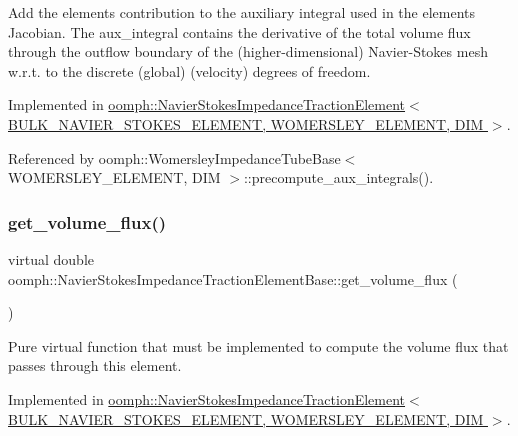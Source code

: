Add the element\textquotesingle{}s contribution to the auxiliary integral used in the element\textquotesingle{}s Jacobian. The aux\+\_\+integral contains the derivative of the total volume flux through the outflow boundary of the (higher-\/dimensional) Navier-\/\+Stokes mesh w.\+r.\+t. to the discrete (global) (velocity) degrees of freedom. 



Implemented in \hyperlink{classoomph_1_1NavierStokesImpedanceTractionElement_addae9a132e1004423ce501f71a84fe07}{oomph\+::\+Navier\+Stokes\+Impedance\+Traction\+Element$<$ B\+U\+L\+K\+\_\+\+N\+A\+V\+I\+E\+R\+\_\+\+S\+T\+O\+K\+E\+S\+\_\+\+E\+L\+E\+M\+E\+N\+T, W\+O\+M\+E\+R\+S\+L\+E\+Y\+\_\+\+E\+L\+E\+M\+E\+N\+T, D\+I\+M $>$}.



Referenced by oomph\+::\+Womersley\+Impedance\+Tube\+Base$<$ W\+O\+M\+E\+R\+S\+L\+E\+Y\+\_\+\+E\+L\+E\+M\+E\+N\+T, D\+I\+M $>$\+::precompute\+\_\+aux\+\_\+integrals().

\mbox{\label{classoomph_1_1NavierStokesImpedanceTractionElementBase_a7f71882ae8a0d34e3d5a5c91586081b3}} 
\subsubsection{\texorpdfstring{get\+\_\+volume\+\_\+flux()}{get\_volume\_flux()}}
{\footnotesize\ttfamily virtual double oomph\+::\+Navier\+Stokes\+Impedance\+Traction\+Element\+Base\+::get\+\_\+volume\+\_\+flux (\begin{DoxyParamCaption}{ }\end{DoxyParamCaption})\hspace{0.3cm}{\ttfamily [pure virtual]}}



Pure virtual function that must be implemented to compute the volume flux that passes through this element. 



Implemented in \hyperlink{classoomph_1_1NavierStokesImpedanceTractionElement_a853055ebb50a6500602288a6f0563852}{oomph\+::\+Navier\+Stokes\+Impedance\+Traction\+Element$<$ B\+U\+L\+K\+\_\+\+N\+A\+V\+I\+E\+R\+\_\+\+S\+T\+O\+K\+E\+S\+\_\+\+E\+L\+E\+M\+E\+N\+T, W\+O\+M\+E\+R\+S\+L\+E\+Y\+\_\+\+E\+L\+E\+M\+E\+N\+T, D\+I\+M $>$}.

